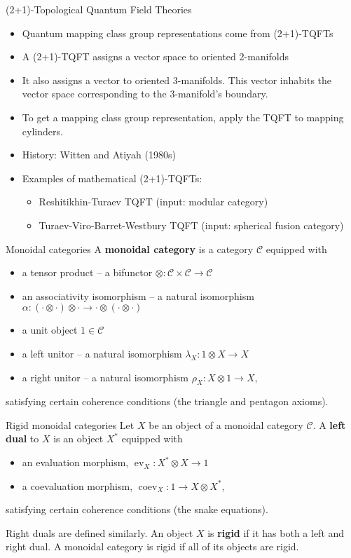 \documentclass{beamer}
\DeclareMathOperator{\ev}{ev}
\DeclareMathOperator{\coev}{coev}
\begin{document}
\begin{frame}{(2+1)-Topological Quantum Field Theories}
\begin{itemize}
\item Quantum mapping class group representations come from (2+1)-TQFTs
\pause
\item A (2+1)-TQFT assigns a vector space to oriented 2-manifolds
\item It also assigns a vector to oriented 3-manifolds. This vector inhabits the vector space corresponding to the 3-manifold's boundary.
\item To get a mapping class group representation, apply the TQFT to mapping cylinders.
\pause
\item History: Witten and Atiyah (1980s)
\pause
\item Examples of mathematical (2+1)-TQFTs: 
\begin{itemize}
\item Reshitikhin-Turaev TQFT (input: modular category)
\item Turaev-Viro-Barret-Westbury TQFT (input: spherical fusion category)
\end{itemize}
\end{itemize}
\end{frame}

\begin{frame}{Monoidal categories}
A \textbf{monoidal category} is a category $\mathcal C$ equipped with
\begin{itemize}
\item a tensor product -- a  bifunctor $\otimes: \mathcal C \times \mathcal C \to \mathcal C$
\item an associativity isomorphism -- a natural isomorphism $\alpha: (\cdot \otimes \cdot) \otimes \cdot \to \cdot \otimes (\cdot \otimes \cdot)$ 
\item a unit object $1 \in \mathcal C$
\item a left unitor -- a natural isomorphism $\lambda_X: 1 \otimes X \to X$
\item a right unitor -- a natural isomorphism $\rho_X: X \otimes 1 \to X$,
\end{itemize}
satisfying certain coherence conditions (the triangle and pentagon axioms).
\end{frame}


\begin{frame}{Rigid monoidal categories}
Let $X$ be an object of a monoidal category $\mathcal C$. A \textbf{left dual} to $X$ is an object $X^*$ equipped with 
\begin{itemize}
\item an evaluation morphism, $\ev_X : X^* \otimes X \to 1$
\item a coevaluation morphism, $\coev_X: 1 \to X \otimes X^*$,
\end{itemize}
satisfying certain coherence conditions (the snake equations).

\pause 
Right duals are defined similarly. An object $X$ is \textbf{rigid} if it
has both a left and right dual.  A monoidal category is rigid if all of
its objects are rigid.
\end{frame}
\end{document}
